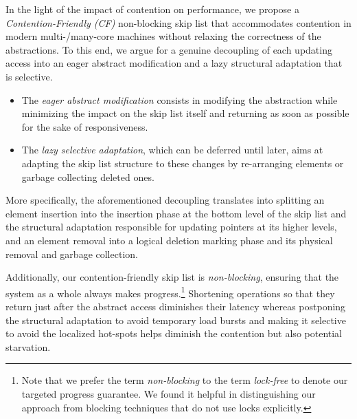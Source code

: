 In the light of the impact of contention on performance, 
we propose a \emph{Contention-Friendly (CF)} non-blocking skip list that accommodates 
contention in modern multi-/many-core machines without relaxing the correctness of the abstractions.
To this end, we argue for a genuine decoupling of each updating access into an
eager abstract modification and a lazy structural adaptation that is selective.
\begin{itemize}
  \item The \emph{eager abstract modification} consists in modifying the abstraction while minimizing the impact on the 
skip list itself and returning as soon as possible for the sake of responsiveness. 
  \item The \emph{lazy selective adaptation}, which can be deferred until later, aims at adapting the skip list structure to these changes by re-arranging elements or 
garbage collecting deleted ones.
\end{itemize}
More specifically, the aforementioned decoupling translates into splitting an 
element insertion into the insertion phase at the bottom level of the skip list and the structural 
adaptation responsible for updating pointers at its higher levels, and an element removal 
into a logical deletion marking phase and its physical removal and garbage collection.

Additionally, our contention-friendly skip list is \emph{non-blocking}, ensuring that the system 
as a whole always makes progress.\footnote{Note that we prefer the term \emph{non-blocking} to the term \emph{lock-free} to denote our targeted progress guarantee.
We found it helpful in distinguishing our approach from  blocking techniques that do not use locks explicitly.}
Shortening operations so that they return just after the abstract access diminishes their latency 
whereas postponing the structural adaptation to avoid temporary load bursts and making it selective 
to avoid the localized hot-spots helps diminish the contention but also potential starvation.


